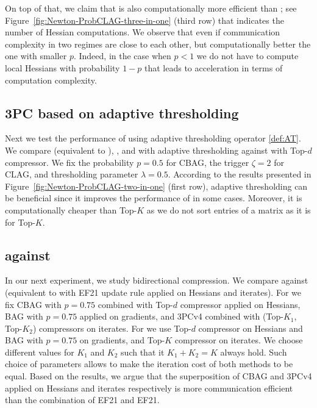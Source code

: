 \documentclass[11pt]{article}
\begin{document}
	On top of that, we claim that  is also computationally more efficient than ; see Figure~\ref{fig:Newton-ProbCLAG-three-in-one} (third row) that indicates the number of Hessian computations. We observe that even if communication complexity in two regimes are close to each other, but computationally better the one with smaller $p$. Indeed, in the case when $p < 1$ we do not have to compute local Hessians with probability $1-p$ that leads to acceleration in terms of computation complexity.
	
	
	
	
	\subsection{ 3PC based on adaptive thresholding}
	Next we test the performance of  using adaptive thresholding operator \eqref{def:AT}. We compare  (equivalent to ), , and  with adaptive thresholding against  with Top-$d$ compressor. We fix the probability $p=0.5$ for CBAG, the trigger $\zeta=2$ for CLAG, and thresholding parameter $\lambda=0.5$. According to the results presented in Figure~\ref{fig:Newton-ProbCLAG-two-in-one} (first row), adaptive thresholding can be beneficial since it improves the performance of  in some cases. Moreover, it is computationally cheaper than Top-$K$ as we do not sort entries of a matrix as it is for Top-$K$.	
	
	\subsection{ against }
	In our next experiment, we study bidirectional compression. We compare  against  (equivalent to  with EF21 update rule applied on Hessians and iterates). For  we fix CBAG with $p=0.75$ combined with Top-$d$ compressor applied on Hessians, BAG with $p=0.75$ applied on gradients, and 3PCv4 \citep{richtarik3PC} combined with (Top-$K_1$, Top-$K_2$) compressors on iterates. For  we use Top-$d$ compressor on Hessians and BAG with $p=0.75$ on gradients, and Top-$K$ compressor on iterates. We choose different values for $K_1$ and $K_2$ such that it $K_1+K_2=K$ always hold. Such choice of parameters allows to make the iteration cost of both methods to be equal. Based on the results, we argue that the superposition of CBAG and 3PCv4 applied on Hessians and iterates respectively is more communication efficient than the combination of EF21 and EF21.
	
\end{document}
